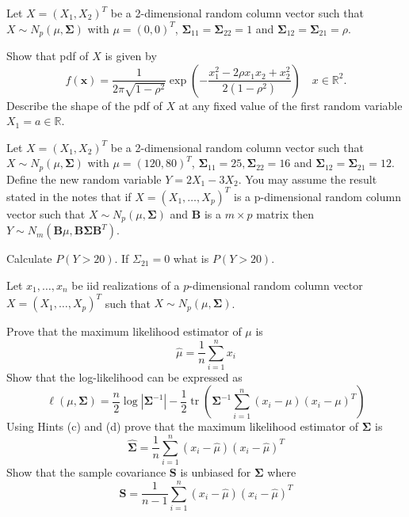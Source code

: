 \documentclass[answers]{exam}
\begin{document}
\begin{questions}
\question%
Let $X=\left(X_{1}, X_{2}\right)^{T}$ be a 2-dimensional random column vector such that $X \sim N_{p}(\mu, \boldsymbol{\Sigma})$ with $\mu=(0,0)^{T}$, $\boldsymbol{\Sigma}_{11}=\boldsymbol{\Sigma}_{22}=1$ and $\boldsymbol{\Sigma}_{12}=\boldsymbol{\Sigma}_{21}=\rho$.
\begin{subparts}
\subpart Show that pdf of $X$ is given by \[
	f(\mathbf{x})=\frac{1}{2 \pi \sqrt{1-\rho^{2}}} \exp \left(-\frac{x_{1}^{2}-2 \rho x_{1} x_{2}+x_{2}^{2}}{2(1-\rho^{2})}\right) \quad x \in \mathbb{R}^{2}.
\]
\subpart Describe the shape of the pdf of $X$ at any fixed value of the first random variable $X_{1}=a \in \mathbb{R}$.
\end{subparts}



\question%
Let $X=\left(X_{1}, X_{2}\right)^{T}$ be a 2-dimensional random column vector such that $X \sim N_{p}(\mu, \boldsymbol{\Sigma})$ with $\mu=(120,80)^{T}$, $\boldsymbol{\Sigma}_{11}=25, \boldsymbol{\Sigma}_{22}=16$ and $\boldsymbol{\Sigma}_{12}=\boldsymbol{\Sigma}_{21}=12$. Define the new random variable $Y=2 X_{1}-3 X_{2}$. You may assume the result stated in the notes that if $X=\left(X_{1}, \ldots, X_{p}\right)^{T}$ is a p-dimensional random column vector such that $X \sim N_{p}(\mu, \boldsymbol{\Sigma})$ and $\boldsymbol{B}$ is a $m \times p$ matrix then $Y \sim N_{m}(\boldsymbol{B} \mu, \boldsymbol{B} \boldsymbol{\Sigma} \boldsymbol{B}^{T})$.
\begin{subparts}
\subpart Calculate $P(Y>20)$.
\subpart If $\Sigma_{21}=0$ what is $P(Y>20)$.
\end{subparts}



\question%
Let $x_{1}, \ldots, x_{n}$ be iid realizations of a $p$-dimensional random column vector $X=\left(X_{1}, \ldots, X_{p}\right)^{T}$ such that $X \sim N_{p}(\mu, \boldsymbol{\Sigma})$.
\begin{subparts}
\subpart Prove that the maximum likelihood estimator of $\mu$ is \[
	\hat{\mu}=\frac{1}{n} \sum_{i=1}^{n} x_{i}
\]
\subpart Show that the log-likelihood can be expressed as \[
	\ell(\mu, \boldsymbol{\Sigma})=\frac{n}{2} \log \left|\boldsymbol{\Sigma}^{-1}\right|-\frac{1}{2} \operatorname{tr}\left(\boldsymbol{\Sigma}^{-1} \sum_{i=1}^{n}\left(x_{i}-\mu\right)\left(x_{i}-\mu\right)^{T}\right)
\]
\subpart Using Hints (c) and (d) prove that the maximum likelihood estimator of $\boldsymbol{\Sigma}$ is \[
	\hat{\boldsymbol{\Sigma}}=\frac{1}{n} \sum_{i=1}^{n}\left(x_{i}-\hat{\mu}\right)\left(x_{i}-\hat{\mu}\right)^{T}
\]
\subpart Show that the sample covariance $\boldsymbol{S}$ is unbiased for $\boldsymbol{\Sigma}$ where \[
	\mathbf{S}=\frac{1}{n-1} \sum_{i=1}^{n}\left(x_{i}-\hat{\mu}\right)\left(x_{i}-\hat{\mu}\right)^{T}
\]
\end{subparts}


\end{questions}
\end{document}
